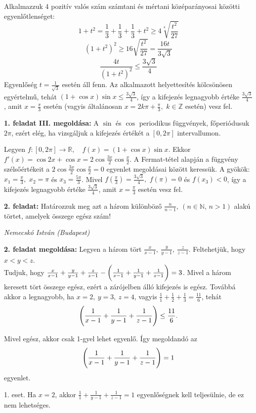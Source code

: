 \documentclass[a4paper,10pt]{article}
\def\ki#1#2{\hfill {\it #1 (#2)}\medskip}
\begin{document}
Alkalmazzuk 4 pozitív valós szám számtani és mértani
középará\-nyosai közötti egyenlőtlenséget:
$$1+t^2=\frac{1}{3}+\frac{1}{3}+\frac{1}{3}+t^2\ge4\sqrt[4]{\frac{t^2}{27}}$$
$$(1+t^2)^2\ge16\sqrt{\frac{t^2}{27}}=\frac{16t}{3\sqrt{3}}$$
$$\frac{4t}{(1+t^2)^2}\le\frac{3\sqrt{3}}{4}$$
Egyenlőség $t=\frac{1}{\sqrt{3}}$ esetén áll fenn. Az alkalmazott
helyettesí\-tés kölcsönösen egyértelmű, tehát
$(1+\cos{x})\sin{x}\le\frac{3\sqrt{3}}{4}$, így a kifejezés
legnagyobb értéke $\frac{3\sqrt{3}}{4}$, amit $x=\frac{\pi}{3}$
esetén (vagyis általánosan $x=2k\pi+\frac{\pi}{3},$ $k\in
\mathbb{Z}$ esetén) vesz fel.

\medskip

\textbf{1. feladat III. megoldása: } A $\sin$ és $\cos$ periodikus függvények, fő\-pe\-ri\-ó\-du\-suk
$2\pi$, ezért elég, ha vizsgáljuk a kifejezés értékét a $[0,2\pi]$
intervallumon.

Legyen $f:[0,2\pi]\longrightarrow\mathbb{R}, \quad
f(x)=(1+\cos{x})\sin{x}$. Ekkor
$f'(x)=\cos{2x}+\cos{x}=2\cos{\frac{3x}{2}}\cos{\frac{x}{2}}$. A
Fermat-tétel alapján a függvény szélsőértékeit a
$2\cos{\frac{3x}{2}}\cos{\frac{x}{2}}=0$ egyenlet megoldásai között
ke\-res\-sük. A gyökök: $x_1=\frac{\pi}{3},$ $x_2=\pi$ és
$x_3=\frac{5\pi}{3}$. Mivel $f(\frac{\pi}{3})=\frac{3\sqrt{3}}{4},$
$f(\pi)=0$ és $f(x_3)<0$, így a kifejezés legnagyobb értéke
$\frac{3\sqrt{3}}{4}$, amit $x=\frac{\pi}{3}$ esetén vesz fel.

\medskip

{\bf 2. feladat: } Határozzuk meg azt a három különböző
$\displaystyle\frac{n}{n-1},\ (n\in\mathbb{N}, \, n>1)$
alakú törtet, amelyek összege egész szám!

\ki{Nemecskó István}{Budapest}\medskip

\textbf{2. feladat megoldása: } Legyen a három tört $\frac{x}{x-1},\ \frac{y}{y-1},\ \frac{z}{z-1}$.
Feltehetjük, hogy $x<y<z$.\\
Tudjuk, hogy
$\frac{x}{x-1}+\frac{y}{y-1}+\frac{z}{z-1}-\bigg{(}\frac{1}{x-1}+\frac{1}{y-1}+\frac{1}{z-1}\bigg{)}=3$.
Mivel a három keresett tört összege egész, ezért a zárójelben álló
kifejezés is egész. Továbbá akkor a legnagyobb, ha $x=2,\ y=3,\
z=4$, vagyis $\frac{1}{1}+\frac{1}{2}+\frac{1}{3}=\frac{11}{6}$,
tehát
\[\Bigg{(}\frac{1}{x-1}+\frac{1}{y-1}+\frac{1}{z-1}\Bigg{)}\le\frac{11}{6}.\]

Mivel  egész, akkor csak 1-gyel lehet egyenlő. Így megoldandó az
\[\Bigg{(}\frac{1}{x-1}+\frac{1}{y-1}+\frac{1}{z-1}\Bigg{)}=1\]
egyenlet.

1. eset. Ha $x=2$, akkor $\frac{1}{1}+\frac{1}{y-1}+\frac{1}{z-1}=1$
egyenlőségnek kell teljesülnie, de ez nem lehetséges.
\end{document}

